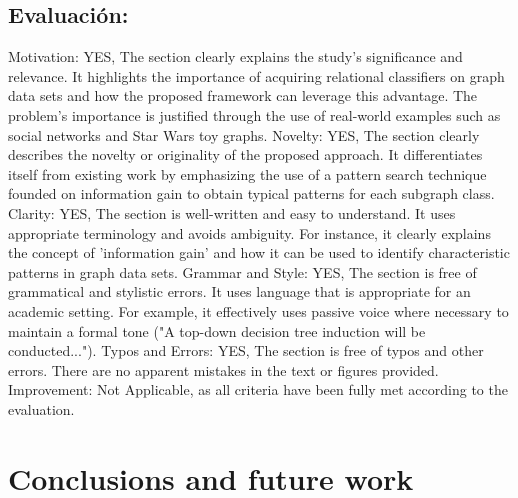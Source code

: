 \documentclass{article}%
\begin{document}
\subsection{Evaluación:}%
\label{subsec:Evaluacin}%
Motivation: YES, The section clearly explains the study's significance and relevance. It highlights the importance of acquiring relational classifiers on graph data sets and how the proposed framework can leverage this advantage. The problem's importance is justified through the use of real{-}world examples such as social networks and Star Wars toy graphs.\newline%
\newline%
Novelty: YES, The section clearly describes the novelty or originality of the proposed approach. It differentiates itself from existing work by emphasizing the use of a pattern search technique founded on information gain to obtain typical patterns for each subgraph class.\newline%
\newline%
Clarity: YES, The section is well{-}written and easy to understand. It uses appropriate terminology and avoids ambiguity. For instance, it clearly explains the concept of 'information gain' and how it can be used to identify characteristic patterns in graph data sets.\newline%
\newline%
Grammar and Style: YES, The section is free of grammatical and stylistic errors. It uses language that is appropriate for an academic setting. For example, it effectively uses passive voice where necessary to maintain a formal tone ("A top{-}down decision tree induction will be conducted...").\newline%
\newline%
Typos and Errors: YES, The section is free of typos and other errors. There are no apparent mistakes in the text or figures provided.\newline%
\newline%
Improvement: Not Applicable, as all criteria have been fully met according to the evaluation.

%
\clearpage%
\section{Conclusions and future work}%
\label{sec:Conclusionsandfuturework}%
\end{document}
